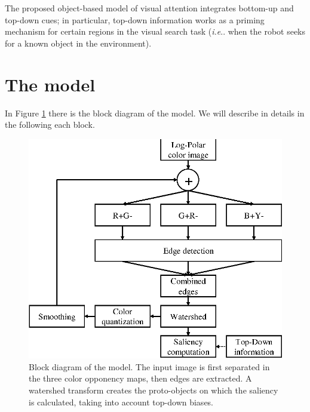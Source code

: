 \documentclass{llncs}
\makeatletter
\DeclareRobustCommand\onedot{\futurelet\@let@token\@onedot}
\def\@onedot{\ifx\@let@token.\else.\null\fi\xspace}
\def\ie{\emph{i.e}\onedot} \def\Ie{\emph{I.e}\onedot}
\makeatother
\begin{document}
The proposed object-based model of visual
attention integrates bottom-up and top-down cues;
in particular, top-down information works as a priming
mechanism for certain regions in the visual search task
(\ie when the robot seeks for a known object in the environment).



\section{The model}
\label{sec:att_model}
In Figure \ref{fig:model_diagram} there is the block diagram of the model.
We will describe in details in the following each block.

\begin{figure}[]
  \begin{center}
    \includegraphics[width=0.6\linewidth]{./figs/attention/schema}
  \end{center}
  \caption{Block diagram of the model. The input image is first separated in
   the three color opponency maps, then edges are extracted. A watershed transform
   creates the proto-objects on which the saliency is calculated,
   taking into account top-down biases.}
  \label{fig:model_diagram}
\end{figure}
\end{document}
